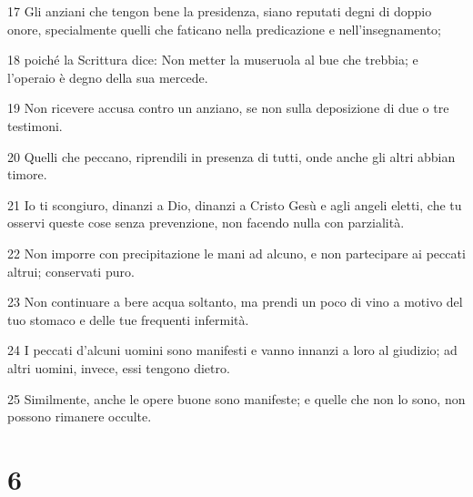 \par 17 Gli anziani che tengon bene la presidenza, siano reputati degni di doppio onore, specialmente quelli che faticano nella predicazione e nell'insegnamento;
\par 18 poiché la Scrittura dice: Non metter la museruola al bue che trebbia; e l'operaio è degno della sua mercede.
\par 19 Non ricevere accusa contro un anziano, se non sulla deposizione di due o tre testimoni.
\par 20 Quelli che peccano, riprendili in presenza di tutti, onde anche gli altri abbian timore.
\par 21 Io ti scongiuro, dinanzi a Dio, dinanzi a Cristo Gesù e agli angeli eletti, che tu osservi queste cose senza prevenzione, non facendo nulla con parzialità.
\par 22 Non imporre con precipitazione le mani ad alcuno, e non partecipare ai peccati altrui; conservati puro.
\par 23 Non continuare a bere acqua soltanto, ma prendi un poco di vino a motivo del tuo stomaco e delle tue frequenti infermità.
\par 24 I peccati d'alcuni uomini sono manifesti e vanno innanzi a loro al giudizio; ad altri uomini, invece, essi tengono dietro.
\par 25 Similmente, anche le opere buone sono manifeste; e quelle che non lo sono, non possono rimanere occulte.

\chapter{6}

